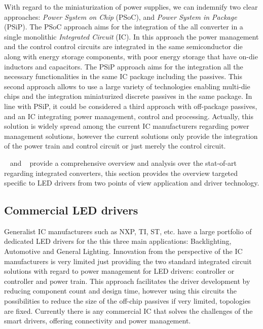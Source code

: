 With regard to the  miniaturization of power supplies, we can indemnify two clear approaches: \emph{Power System on Chip} (PSoC), and   \emph{Power System in Package} (PSiP). The PSoC approach aims for the integration of the all converter in a single monolithic \emph{Integrated Circuit} (IC). In this approach the power management and the control control circuits are integrated in the same semiconductor die along with energy storage components, with poor energy storage that have on-die inductors and capacitors. The PSiP approach aims for the integration all the necessary functionalities in the same IC package including the passives. This second approach allows to use a large variety of technologies enabling multi-die chips and the integration miniaturized discrete passives in the same package. In line with PSiP, it could be considered a third approach with off-package  passives, and an IC integrating  power management, control and processing.  Actually, this solution is widely spread among the current IC manufacturers regarding power management solutions, however the current solutions only provide the integration of the power train and control circuit or just merely the control circuit.

\citeauthor{2013Breussegem:int_conv}~\cite{2013Breussegem:int_conv} and \citeauthor{2013villar}~\cite{2013villar} provide a comprehensive overview and analysis over the stat-of-art regarding integrated converters, this section provides the overview targeted specific to LED drivers from two points of view application and driver technology.

\subsection{Commercial LED drivers }

Generalist IC manufacturers such as NXP, TI, ST, etc. have a large portfolio of dedicated LED drivers for the this three main applications: Backlighting, Automotive and General Lighting. Innovation from the perspective of the IC manufacturers is very limited just providing the two standard integrated circuit solutions with regard to power management for LED drivers: controller or controller and power train. This approach facilitates the driver development by reducing component count and design time, however  using this circuits the possibilities to reduce the size of the off-chip passives if very limited, topologies are fixed. Currently there is any commercial IC that solves the challenges of the smart drivers, offering connectivity and power management.

